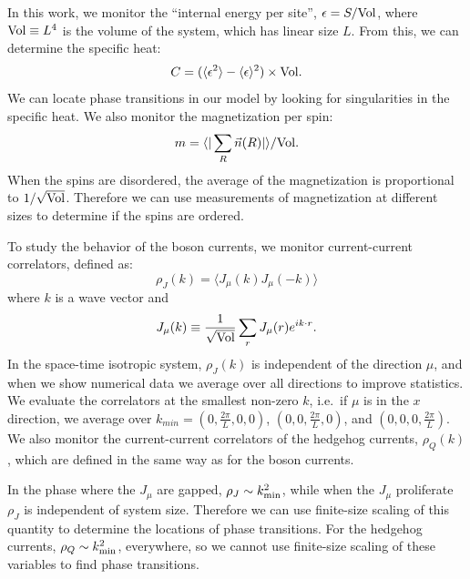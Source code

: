 \documentclass[prb,twocolumn]{revtex4-1}
\def\ra{\rangle} %
\def\la{\langle} %
\begin{document}
In this work, we monitor the ``internal energy per site'', $\epsilon= S /{\rm Vol}$, where ${\rm Vol}\equiv L^4$ is the volume of the system, which has linear size $L$. From this, we can determine the specific heat:
\begin{equation}
C=(\la \epsilon^2\ra-\la\epsilon\ra^2)\times{\rm Vol}.
\end{equation}
We can locate phase transitions in our model by looking for singularities in the specific heat. We also monitor the magnetization per spin:
\begin{equation}
m=\la |\sum_R \vec{n}(R)|\ra/{\rm Vol}.
\end{equation}
When the spins are disordered, the average of the magnetization is proportional to $1/\sqrt{\rm Vol}$. Therefore we can use measurements of magnetization at different sizes to determine if the spins are ordered.

To study the behavior of the boson currents, we monitor current-current correlators, defined as:
\begin{equation}
\rho_J({k})=\la J_\mu({k})J_\mu(-{k})\ra
\end{equation}
where $k$ is a wave vector and 
\begin{equation}
J_\mu({k})\equiv\frac{1}{\rm \sqrt{Vol}}\sum_r J_\mu(r)e^{i{k}\cdot r}.
\end{equation}
In the space-time isotropic system, $\rho_J({k})$ is independent of the direction $\mu$, and when we show numerical data we average over all directions to improve statistics. We evaluate the correlators at the smallest non-zero ${k}$, i.e.~if $\mu$ is in the $x$ direction, we average over ${k}_{min}=(0,\frac{2\pi}{L},0,0)$, $(0,0,\frac{2\pi}{L},0)$, and $(0,0,0,\frac{2\pi}{L})$. We also monitor the current-current correlators of the hedgehog currents, $\rho_Q(k)$, which are defined in the same way as for the boson currents.

In the phase where the $J_\mu$ are gapped, $\rho_J\sim {k}_{\rm min}^2$, while when the $J_\mu$ proliferate $\rho_J$ is independent of system size. Therefore we can use finite-size scaling of this quantity to determine the locations of phase transitions. For the hedgehog currents, $\rho_Q\sim {k}_{\rm min}^2$, everywhere, so we cannot use finite-size scaling of these variables to find phase transitions. 
\end{document}
